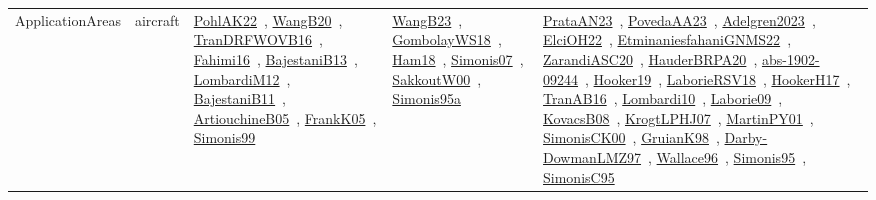 {\begin{longtable}{lp{3cm}>{\raggedright\arraybackslash}p{6cm}>{\raggedright\arraybackslash}p{6cm}>{\raggedright\arraybackslash}p{8cm}}
ApplicationAreas & aircraft & \href{../works/PohlAK22.pdf}{PohlAK22}~\cite{PohlAK22}, \href{../works/WangB20.pdf}{WangB20}~\cite{WangB20}, \href{../works/TranDRFWOVB16.pdf}{TranDRFWOVB16}~\cite{TranDRFWOVB16}, \href{../works/Fahimi16.pdf}{Fahimi16}~\cite{Fahimi16}, \href{../works/BajestaniB13.pdf}{BajestaniB13}~\cite{BajestaniB13}, \href{../works/LombardiM12.pdf}{LombardiM12}~\cite{LombardiM12}, \href{../works/BajestaniB11.pdf}{BajestaniB11}~\cite{BajestaniB11}, \href{../works/ArtiouchineB05.pdf}{ArtiouchineB05}~\cite{ArtiouchineB05}, \href{../works/FrankK05.pdf}{FrankK05}~\cite{FrankK05}, \href{../works/Simonis99.pdf}{Simonis99}~\cite{Simonis99} & \href{../works/WangB23.pdf}{WangB23}~\cite{WangB23}, \href{../works/GombolayWS18.pdf}{GombolayWS18}~\cite{GombolayWS18}, \href{../works/Ham18.pdf}{Ham18}~\cite{Ham18}, \href{../works/Simonis07.pdf}{Simonis07}~\cite{Simonis07}, \href{../works/SakkoutW00.pdf}{SakkoutW00}~\cite{SakkoutW00}, \href{../works/Simonis95a.pdf}{Simonis95a}~\cite{Simonis95a} & \href{../works/PrataAN23.pdf}{PrataAN23}~\cite{PrataAN23}, \href{../works/PovedaAA23.pdf}{PovedaAA23}~\cite{PovedaAA23}, \href{../works/Adelgren2023.pdf}{Adelgren2023}~\cite{Adelgren2023}, \href{../works/ElciOH22.pdf}{ElciOH22}~\cite{ElciOH22}, \href{../works/EtminaniesfahaniGNMS22.pdf}{EtminaniesfahaniGNMS22}~\cite{EtminaniesfahaniGNMS22}, \href{../works/ZarandiASC20.pdf}{ZarandiASC20}~\cite{ZarandiASC20}, \href{../works/HauderBRPA20.pdf}{HauderBRPA20}~\cite{HauderBRPA20}, \href{../works/abs-1902-09244.pdf}{abs-1902-09244}~\cite{abs-1902-09244}, \href{../works/Hooker19.pdf}{Hooker19}~\cite{Hooker19}, \href{../works/LaborieRSV18.pdf}{LaborieRSV18}~\cite{LaborieRSV18}, \href{../works/HookerH17.pdf}{HookerH17}~\cite{HookerH17}, \href{../works/TranAB16.pdf}{TranAB16}~\cite{TranAB16}, \href{../works/Lombardi10.pdf}{Lombardi10}~\cite{Lombardi10}, \href{../works/Laborie09.pdf}{Laborie09}~\cite{Laborie09}, \href{../works/KovacsB08.pdf}{KovacsB08}~\cite{KovacsB08}, \href{../works/KrogtLPHJ07.pdf}{KrogtLPHJ07}~\cite{KrogtLPHJ07}, \href{../works/MartinPY01.pdf}{MartinPY01}~\cite{MartinPY01}, \href{../works/SimonisCK00.pdf}{SimonisCK00}~\cite{SimonisCK00}, \href{../works/GruianK98.pdf}{GruianK98}~\cite{GruianK98}, \href{../works/Darby-DowmanLMZ97.pdf}{Darby-DowmanLMZ97}~\cite{Darby-DowmanLMZ97}, \href{../works/Wallace96.pdf}{Wallace96}~\cite{Wallace96}, \href{../works/Simonis95.pdf}{Simonis95}~\cite{Simonis95}, \href{../works/SimonisC95.pdf}{SimonisC95}~\cite{SimonisC95}\\

\end{longtable}}
